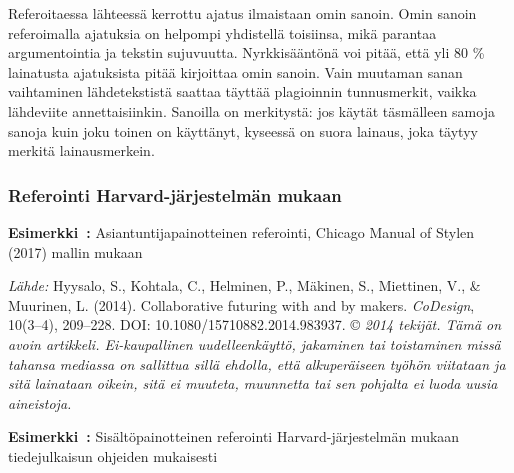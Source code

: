 \documentclass[finnish, 12pt, a4paper, elec, utf8, a-2b, online]{aaltothesis}
\begin{document}
Referoitaessa lähteessä kerrottu ajatus ilmaistaan omin sanoin. Omin sanoin 
referoimalla ajatuksia on helpompi yhdistellä toisiinsa, mikä parantaa 
argumentointia ja tekstin sujuvuutta. Nyrkkisääntönä voi pitää, että yli 80 \% 
lainatusta ajatuksista pitää kirjoittaa omin sanoin. Vain muutaman sanan 
vaihtaminen lähdetekstistä saattaa täyttää plagioinnin tunnusmerkit, vaikka 
lähdeviite annettaisiinkin. Sanoilla on merkitystä: jos käytät täsmälleen samoja
sanoja kuin joku toinen on käyttänyt, kyseessä on suora lainaus, joka täytyy 
merkitä lainausmerkein.

\subsubsection*{Referointi Harvard-järjestelmän mukaan}

\textsf{\textbf{Esimerkki~\theexample:}} Asiantuntijapainotteinen referointi, 
Chicago Manual of Stylen (2017) mallin mukaan

\vspace{1ex}
\noindent
{}

\vspace{1ex}
\noindent
\textit{Lähde:} Hyysalo, S., Kohtala, C., Helminen, P., Mäkinen, S., Miettinen,
V., \& Muurinen, L. (2014). Collaborative futuring with and by makers. 
\textit{CoDesign}, 10(3--4), 209--228. DOI: 10.1080/15710882.2014.983937. 
\copyright{} \textit{2014 tekijät. Tämä on avoin artikkeli. Ei-kaupallinen 
	uudelleenkäyttö, jakaminen tai toistaminen missä tahansa mediassa on 
	sallittua sillä ehdolla, että alkuperäiseen työhön viitataan ja sitä 
	lainataan oikein, sitä ei muuteta, muunnetta tai sen pohjalta ei luoda uusia 
	aineistoja.}

\vspace{1em}
\noindent
{}
\textsf{\textbf{Esimerkki~\theexample:}} Sisältöpainotteinen referointi Harvard-järjestelmän mukaan tiedejulkaisun ohjeiden mukaisesti

\vspace{1ex}
\noindent
{}
\end{document}
